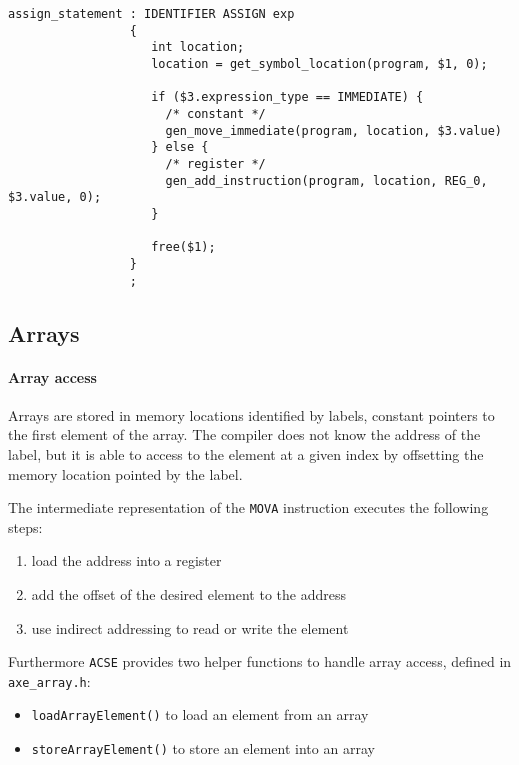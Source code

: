 \begin{onepage}
  \begin{lstlisting}[language=LANCE, caption={Assignment code generation}, label={code:assignment-code-generation}]
assign_statement : IDENTIFIER ASSIGN exp
                 {
                    int location;
                    location = get_symbol_location(program, $1, 0);

                    if ($3.expression_type == IMMEDIATE) {
                      /* constant */
                      gen_move_immediate(program, location, $3.value)
                    } else {
                      /* register */
                      gen_add_instruction(program, location, REG_0, $3.value, 0);
                    }

                    free($1);
                 }
                 ;
\end{lstlisting}
\end{onepage}

\subsection{Arrays}

\paragraph{Array access}

Arrays are stored in memory locations identified by labels, constant pointers to the first element of the array.
The compiler does not know the address of the label, but it is able to access to the element at a given index by offsetting the memory location pointed by the label.

The intermediate representation of the \texttt{MOVA} instruction executes the following steps:

\begin{enumerate}
  \item load the address into a register
  \item add the offset of the desired element to the address
  \item use indirect addressing to read or write the element
\end{enumerate}

Furthermore \texttt{ACSE} provides two helper functions to handle array access, defined in \texttt{axe\_array.h}:

\begin{itemize}[label=\textbf{\texttt{>}}]
  \item \texttt{loadArrayElement()} to load an element from an array
  \item \texttt{storeArrayElement()} to store an element into an array
\end{itemize}


